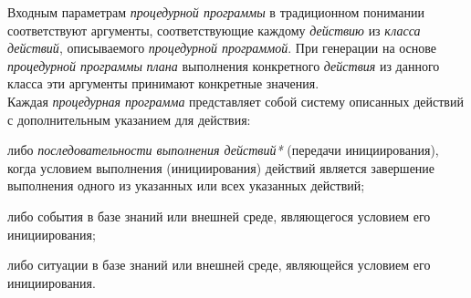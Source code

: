 \begin{SCn}
\begin{scnsubstruct}
\begin{scnindent}
{                Входным параметрам \textit{процедурной программы} в традиционном понимании соответствуют аргументы, соответствующие каждому \textit{действию} из \textit{класса действий}, описываемого \textit{процедурной программой}. При генерации на основе \textit{процедурной программы} \textit{плана} выполнения конкретного \textit{действия} из данного класса эти аргументы принимают конкретные значения.\\
                Каждая \textit{процедурная программа} представляет собой систему описанных действий с дополнительным указанием для действия:
	            \begin{scnitemize}
	                \item либо \textit{последовательности выполнения действий*} (передачи инициирования), когда условием выполнения (инициирования) действий является завершение выполнения одного из указанных или всех указанных действий;
	                \item либо события в базе знаний или внешней среде, являющегося условием его инициирования;
	                \item либо ситуации в базе знаний или внешней среде, являющейся условием его инициирования.
	            \end{scnitemize}}
         \end{scnindent}
	     \begin{scnindent}
	     \end{scnindent}

\end{scnsubstruct}
\end{SCn}
